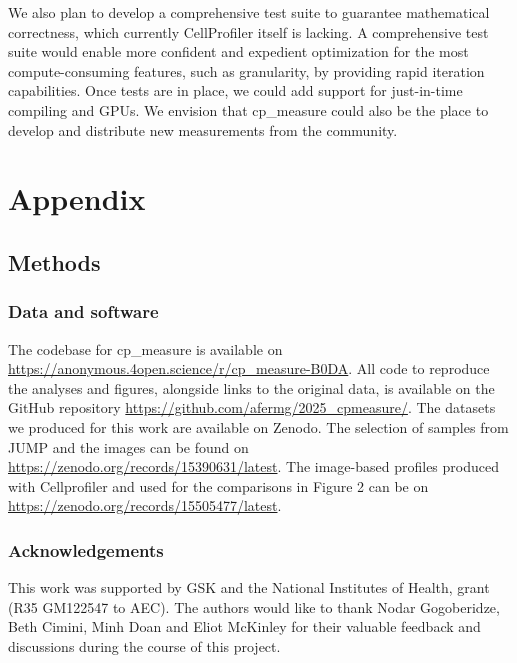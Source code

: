 \documentclass{article}
\begin{document}
We also plan to develop a comprehensive test suite to guarantee mathematical correctness, which currently CellProfiler itself is lacking. A comprehensive test suite would enable more confident and expedient optimization for the most compute-consuming features, such as granularity, by providing rapid iteration capabilities. Once tests are in place, we could add support for just-in-time compiling and GPUs. We envision that cp\_measure could also be the place to develop and distribute new measurements from the community. 



\section{Appendix}
\label{sec:orgdd18dd8}
\subsection{Methods}
\label{sec:orgb3e9382}
\subsubsection{Data and software}
\label{sec:orgbda0ae2}
The codebase for cp\_measure is available on \url{https://anonymous.4open.science/r/cp\_measure-B0DA}. All code to reproduce the analyses and figures, alongside links to the original data, is available on the GitHub repository \url{https://github.com/afermg/2025\_cpmeasure/}. The datasets we produced for this work are available on Zenodo. The selection of samples from JUMP and the images can be found on \url{https://zenodo.org/records/15390631/latest}. The image-based profiles produced with Cellprofiler and used for the comparisons in Figure 2 can be on \url{https://zenodo.org/records/15505477/latest}.

\subsubsection{Acknowledgements}
\label{sec:acknowledgements}

This work was supported by GSK and the National Institutes of Health, grant (R35 GM122547 to AEC). The authors would like to thank Nodar Gogoberidze, Beth Cimini, Minh Doan and Eliot McKinley for their valuable feedback and discussions during the course of this project.
\end{document}
